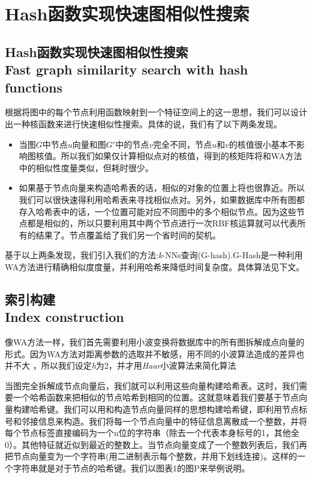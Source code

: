 \documentclass{article}
\begin{document}
\chapter{Hash函数实现快速图相似性搜索}
\else
\section{Hash函数实现快速图相似性搜索 \\ Fast graph similarity search with hash functions}
\fi
根据将图中的每个节点利用函数映射到一个特征空间上的这一思想，我们可以设计出一种核函数来进行快速相似性搜索。具体的说，我们有了以下两条发现。
\begin{itemize}
    \item 当图$G$中节点$u$向量和图$G'$中的节点$v$完全不同，节点$u$和$v$的核值很小基本不影响图核值。所以我们如果仅计算相似点对的核值，得到的核矩阵将和WA方法中的相似性度量类似，但耗时很少。
    \item 如果基于节点向量来构造哈希表的话，相似的对象的位置上将也很靠近。所以我们可以很快速得利用哈希表来寻找相似点对。另外，如果数据库中所有图都存入哈希表中的话，一个位置可能对应不同图中的多个相似节点。因为这些节点都是相似的，所以只要利用其中两个节点进行一次RBF核运算就可以代表所有的结果了。节点覆盖给了我们另一个省时间的契机。
\end{itemize}

基于以上两条发现，我们引入我们的方法:\emph{k}-NNs查询(G-hash).G-Hash是一种利用WA方法进行精确相似度度量，并利用哈希来降低时间复杂度。具体算法见下文。

\section{索引构建 \\ Index construction}
像WA方法一样，我们首先需要利用小波变换将数据库中的所有图拆解成点向量的形式。因为WA方法对距离参数的选取并不敏感，用不同的小波算法造成的差异也并不大\cite{Graph_wavelet} ，所以我们设定\emph{h}为2，并才用\emph{Haar}小波算法来简化算法

当图完全拆解成节点向量后，我们就可以利用这些向量构建哈希表。这时，我们需要一个哈希函数来把相似的节点哈希到相同的位置。这就意味着我们要基于节点向量构建哈希键。我们可以用和构造节点向量同样的思想构建哈希键，即利用节点标号和邻接信息来构造。我们将每一个节点向量中的特征信息离散成一个整数，并将每个节点标签直接编码为一个n位的字符串（除去一个代表本身标号的1，其他全0）。其他特征就近似到最近的整数上。当节点向量变成了一个整数列表后，我们再把节点向量变为一个字符串(用二进制表示每个整数，并用下划线连接)。这样的一个字符串就是对于节点的哈希键。我们以图表1的图P来举例说明。
\end{document}
